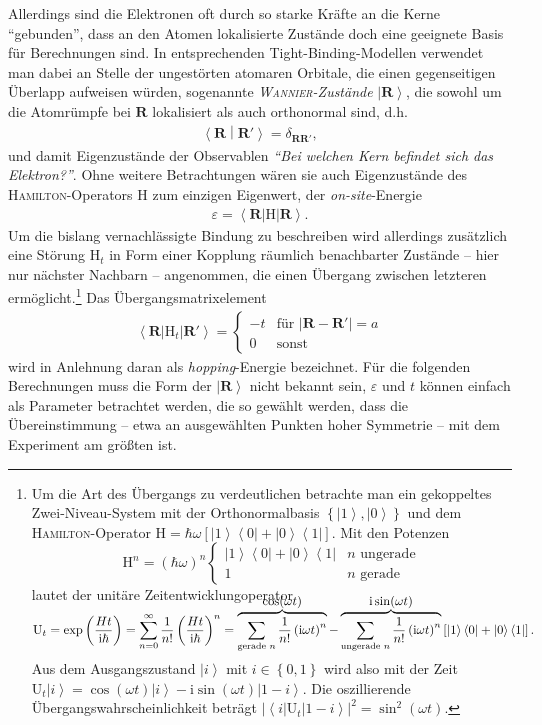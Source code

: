 \documentclass[a4paper, 10pt, twoside, openany]{book} %
\newcommand \bra[1]{\left \langle #1 \right |}
\newcommand \ket[1]{\left | #1 \right \rangle}
\newcommand \bracket[2]{\left \langle #1 \middle | #2 \right \rangle}
\newcommand \parens[1]{\left ( #1 \right )}
\newcommand \bracks[1]{\left [ #1 \right ]}
\newcommand \braces[1]{\left \lbrace #1 \right \rbrace}
\newcommand \abs[1]{\left | #1 \right |}
\def \I {\mathrm i}
\def \epsilon {\varepsilon}
\def \vec {\boldsymbol}
\newcommand \op[1]{\mathrm{#1}}
\begin{document}
	Allerdings sind die Elektronen oft durch so starke Kräfte an die Kerne "`gebunden"', dass an den Atomen lokalisierte Zustände doch eine geeignete Basis für Berechnungen sind. In entsprechenden Tight-Binding-Modellen verwendet man dabei an Stelle der ungestörten atomaren Orbitale, die einen gegenseitigen Überlapp aufweisen würden, sogenannte \emph{\textsc{Wannier}-Zustände} $\ket{\vec R}$, die sowohl um die Atomrümpfe bei $\vec R$ lokalisiert als auch orthonormal sind, d.h.
	\begin{align}
		\bracket{\vec R}{\vec R'} = \delta_{\vec R \vec R'},
		\label{orthogonale R}
	\end{align}
	und damit Eigenzustände der Observablen \emph{"`Bei welchen Kern befindet sich das Elektron?"'}. Ohne weitere Betrachtungen wären sie auch Eigenzustände des \textsc{Hamilton}-Operators $\op H$ zum einzigen Eigenwert, der \emph{on-site}-Energie
	\begin{align*}
		\epsilon = \bra{\vec R} \op H \ket{\vec R}.
	\end{align*}
	Um die bislang vernachlässigte Bindung zu beschreiben wird allerdings zusätzlich eine Störung $\op H_t$ in Form einer Kopplung räumlich benachbarter Zustände -- hier nur nächster Nachbarn -- angenommen, die einen Übergang zwischen letzteren ermöglicht.\footnote{Um die Art des Übergangs zu verdeutlichen betrachte man ein gekoppeltes Zwei-Niveau-System mit der Orthonormalbasis $\braces{\ket 1, \ket 0}$ und dem \textsc{Hamilton}-Operator $\op H = \hbar \omega \bracks{\ket 1 \bra 0 + \ket 0 \bra 1}$. Mit den Potenzen $$\op H^n = (\hbar \omega)^n \begin{cases} \ket 1 \bra 0 + \ket 0 \bra 1 & \text{$n$ ungerade} \\ 1 & \text{$n$ gerade} \end{cases}$$ lautet der unitäre Zeitentwicklungoperator $$\op U_t = \exp \parens{\frac{H t}{\I \hbar}} = \sum_{n = 0}^\infty \frac 1 {n!} \parens{\frac{H t}{\I \hbar}}^n = \smash{\overbrace{\sum_\text{gerade $n$} \frac 1 {n!} \parens{\I \omega  t}^n}^{\displaystyle \cos(\omega t)} - \overbrace{\sum_\text{ungerade $n$} \frac{1}{n!} \parens{\I \omega t}^n}^{\displaystyle \I \sin(\omega t)}} \bracks{\ket 1 \bra 0 + \ket 0 \bra 1}.$$ Aus dem Ausgangszustand $\ket i$ mit $i \in \braces{0, 1}$ wird also mit der Zeit $\op U_t \ket i = \cos(\omega t) \ket i - \I \sin(\omega t) \ket{1 - i}$. Die oszillierende Übergangswahrscheinlichkeit beträgt $|\bra i \op U_t \ket{1 - i}|^2 = \sin^2(\omega t).$} Das Übergangsmatrixelement
	\begin{align*}
		\bra{\vec R} \op H_t \ket{\vec R'} =
		\begin{cases}
			-t & \text{für } \abs{\vec R - \vec R'} = a \\
			0 & \text{sonst}
		\end{cases}
	\end{align*}
	wird in Anlehnung daran als \emph{hopping}-Energie bezeichnet. Für die folgenden Berechnungen muss die Form der $\ket{\vec R}$ nicht bekannt sein, $\epsilon$ und $t$ können einfach als Parameter betrachtet werden, die so gewählt werden, dass die Übereinstimmung -- etwa an ausgewählten Punkten hoher Symmetrie -- mit dem Experiment am größten ist.
	
\end{document}
